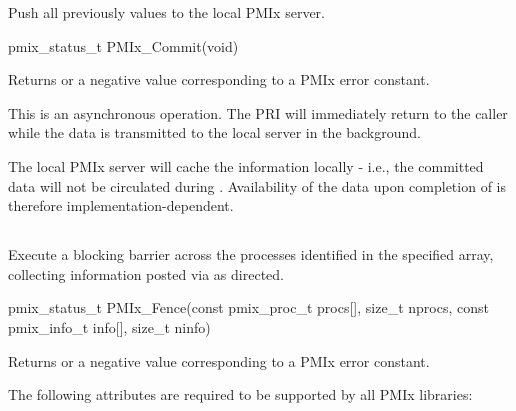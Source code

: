 \summary

Push all previously  values to the local PMIx server.

\format

\cspecificstart
\begin{codepar}
pmix_status_t PMIx_Commit(void)
\end{codepar}
\cspecificend

Returns  or a negative value corresponding to a PMIx error constant.

\descr

This is an asynchronous operation.
The \ac{PRI} will immediately return to the caller while the data is transmitted to the local server in the background.

\adviceuserstart
The local PMIx server will cache the information locally - i.e., the committed data will not be circulated during .
Availability of the data upon completion of  is therefore implementation-dependent.
\adviceuserend


\subsection{}

\summary

Execute a blocking barrier across the processes identified in the specified array, collecting information posted via  as directed.

\format

\cspecificstart
\begin{codepar}
pmix_status_t
PMIx_Fence(const pmix_proc_t procs[], size_t nprocs,
           const pmix_info_t info[], size_t ninfo)
\end{codepar}
\cspecificend

\begin{arglist}
\end{arglist}

Returns  or a negative value corresponding to a PMIx error constant.

\reqattrstart
The following attributes are required to be supported by all \ac{PMIx} libraries:

